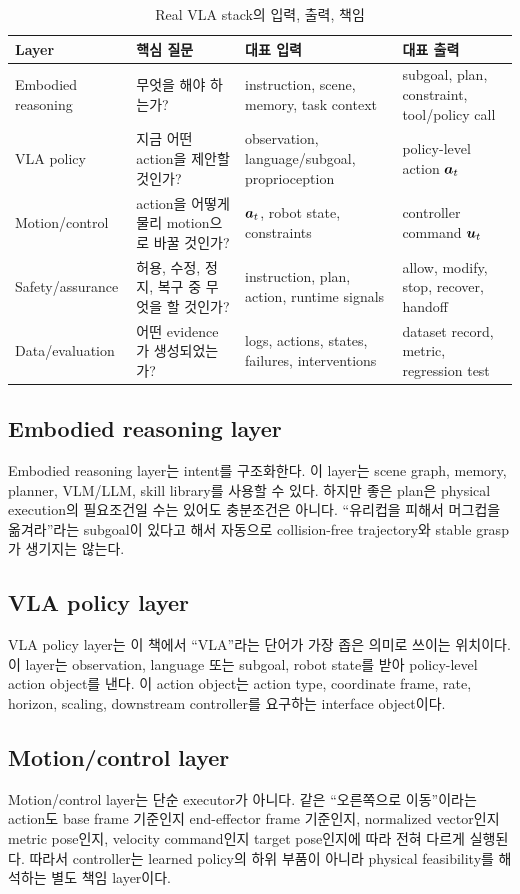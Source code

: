 \begin{table}[ht]
\centering
\caption{Real VLA stack의 입력, 출력, 책임}
\label{tab:stack}
\small
\begin{tabularx}{\textwidth}{p{24mm}X X X}
\toprule
Layer & 핵심 질문 & 대표 입력 & 대표 출력 \\
\midrule
Embodied reasoning & 무엇을 해야 하는가? & instruction, scene, memory, task context & subgoal, plan, constraint, tool/policy call \\
VLA policy & 지금 어떤 action을 제안할 것인가? & observation, language/subgoal, proprioception & policy-level action $\bm{a}_t$ \\
Motion/control & action을 어떻게 물리 motion으로 바꿀 것인가? & $\bm{a}_t$, robot state, constraints & controller command $\bm{u}_t$ \\
Safety/assurance & 허용, 수정, 정지, 복구 중 무엇을 할 것인가? & instruction, plan, action, runtime signals & allow, modify, stop, recover, handoff \\
Data/evaluation & 어떤 evidence가 생성되었는가? & logs, actions, states, failures, interventions & dataset record, metric, regression test \\
\bottomrule
\end{tabularx}
\end{table}

\subsection{Embodied reasoning layer}
Embodied reasoning layer는 intent를 구조화한다. 이 layer는 scene graph, memory, planner, VLM/LLM, skill library를 사용할 수 있다. 하지만 좋은 plan은 physical execution의 필요조건일 수는 있어도 충분조건은 아니다. ``유리컵을 피해서 머그컵을 옮겨라''라는 subgoal이 있다고 해서 자동으로 collision-free trajectory와 stable grasp가 생기지는 않는다.

\subsection{VLA policy layer}
VLA policy layer는 이 책에서 ``VLA''라는 단어가 가장 좁은 의미로 쓰이는 위치이다. 이 layer는 observation, language 또는 subgoal, robot state를 받아 policy-level action object를 낸다. 이 action object는 action type, coordinate frame, rate, horizon, scaling, downstream controller를 요구하는 interface object이다.

\subsection{Motion/control layer}
Motion/control layer는 단순 executor가 아니다. 같은 ``오른쪽으로 이동''이라는 action도 base frame 기준인지 end-effector frame 기준인지, normalized vector인지 metric pose인지, velocity command인지 target pose인지에 따라 전혀 다르게 실행된다. 따라서 controller는 learned policy의 하위 부품이 아니라 physical feasibility를 해석하는 별도 책임 layer이다.

